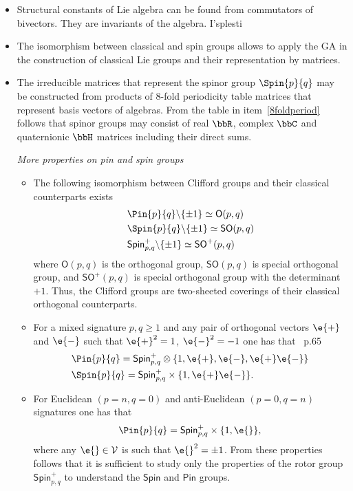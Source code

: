 \begin{example}
\begin{unit}
\begin{itemize}
%
\item[$\bullet$]  Structural constants of Lie algebra can be found
from commutators of bivectors. They are invariants of the algebra.
I'splesti
%
\item[$\bullet$] The isomorphism between classical and spin groups
allows to apply the GA in the construction of classical Lie groups
and their representation by matrices.


%
\item[$\bullet$] The irreducible  matrices that represent the
spinor group $\Spin{p}{q}$ may be constructed from
products of $8$-fold periodicity table matrices  that represent
basis vectors of  algebras. From the table in
item~\ref{8foldperiod} follows that spinor groups may consist of
real $\bbR$, complex $\bbC$ and quaternionic
$\bbH$ matrices including their direct sums.


\begin{unit}\textit{More properties on pin and spin groups}
\begin{itemize}
\item[$\bullet$] The following isomorphism between Clifford groups
and their classical counterparts exists
\[\begin{split}
&\Pin{p}{q}\backslash\{\pm 1\}\simeq\mathsf{O}(p,q)\\
&\Spin{p}{q}\backslash\{\pm 1\}\simeq\mathsf{SO}(p,q)\\
&\mathsf{Spin}^{+}_{p,q}\backslash\{\pm 1\}\simeq\mathsf{SO}^+(p,q)\\
\end{split}\]
where $\mathsf{O}(p,q)$ is the orthogonal group,
$\mathsf{SO}(p,q)$ is special orthogonal group, and
$\mathsf{SO}^+(p,q)$ is special orthogonal group with the
determinant $+1$. Thus, the Clifford groups are two-sheeted
coverings of their classical orthogonal counterparts.


\item[$\bullet$] For a mixed signature $p,q\ge 1$ and any pair of
orthogonal vectors $\e{+}$ and $\e{-}$ such that $\e{+}^2=1$,
$\e{-}^2=-1$ one has that~\cite{Lundholm09} p.65
\[\begin{split}
&\Pin{p}{q}=\mathsf{Spin}^{+}_{p,q}\otimes\{1,\e{+},\e{-},\e{+}\e{-}\}\\
&\Spin{p}{q}=\mathsf{Spin}^{+}_{p,q}\times\{1,\e{+}\e{-}\}.\\
\end{split}\]
\item[$\bullet$] For Euclidean $(p=n,q=0)$ and anti-Euclidean
$(p=0,q=n)$ signatures one has that
\[\Pin{p}{q}=\mathsf{Spin}^{+}_{p,q}\times\{1,\e{}\}, \]
where any $\e{}\in\mathcal{V}$ is such that $\e{}^2=\pm 1$. From
these properties follows  that it is sufficient to study only the
properties of the rotor group $\mathsf{Spin}^{+}_{p,q}$ to
understand the $\mathsf{Spin}$ and $\mathsf{Pin}$ groups.


\end{itemize}
\end{unit}
\end{itemize}
\end{unit}
\end{example}
